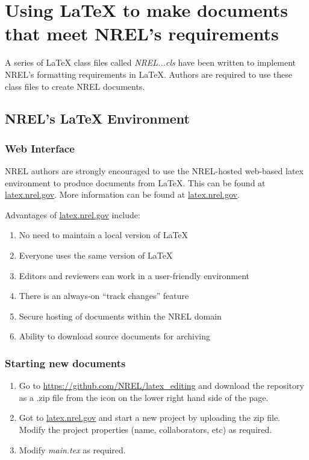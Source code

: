 \chapter{Using LaTeX to make documents that meet NREL's requirements}
A series of LaTeX class files called \emph{NREL...cls} have been written to implement NREL's formatting requirements in LaTeX. Authors are required to use these class files to create NREL documents.

\section{NREL's LaTeX Environment}
\subsection{Web Interface}
NREL authors are strongly encouraged to use the NREL-hosted web-based latex environment to produce documents from LaTeX. This can be found at \href{latex.nrel.gov}{latex.nrel.gov}. More information can be found at \href{latex.nrel.gov}{latex.nrel.gov}.

Advantages of \href{latex.nrel.gov}{latex.nrel.gov} include:
\begin{enumerate}
\item No need to maintain a local version of LaTeX
\item Everyone uses the same version of LaTeX
\item Editors and reviewers can work in a user-friendly environment
\item There is an always-on ``track changes'' feature
\item Secure hosting of documents within the NREL domain
\item Ability to download source documents for archiving
\end{enumerate}

\subsection{Starting new documents}
\begin{enumerate}
\item Go to \href{https://github.com/NREL/latex_editing}{https://github.com/NREL/latex\_editing} and download the repository as a .zip file from the icon on the lower right hand side of the page.
\item Got to \href{latex.nrel.gov}{latex.nrel.gov} and start a new project by uploading the zip file. Modify the project properties (name, collaborators, etc) as required.
\item Modify \emph{main.tex} as required.
\end{enumerate}

